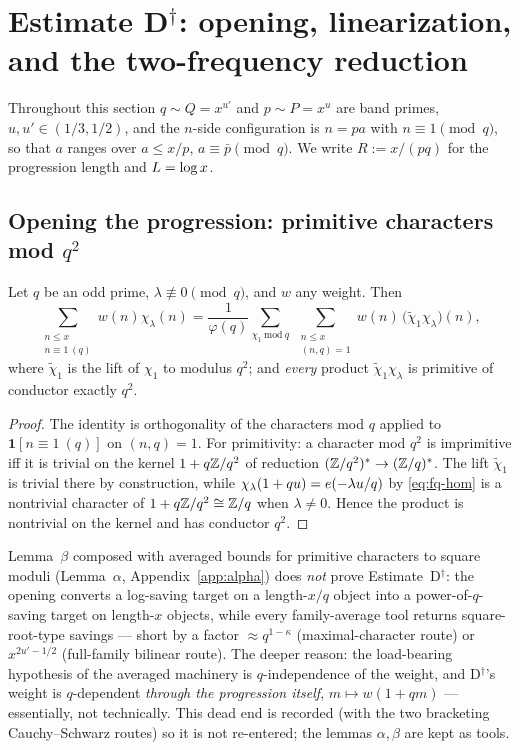 \section{Estimate D$^\dagger$: opening, linearization, and the
two-frequency reduction}\label{sec:reduction}

Throughout this section $q\sim Q=x^{u'}$ and $p\sim P=x^{u}$ are band
primes, $u,u'\in(1/3,1/2)$, and the $n$-side configuration is $n=pa$ with
$n\equiv1\pmod q$, so that $a$ ranges over $a\le x/p$,
$a\equiv\bar p\pmod q$. We write $R:=x/(pq)$ for the progression length
and $L=\log x$.

\subsection{Opening the progression: primitive characters mod $q^2$}

\begin{lemma}\label{lem:beta}
\statusPM\quad
Let $q$ be an odd prime, $\lambda\not\equiv0\pmod q$, and $w$ any weight.
Then
\[
\sum_{\substack{n\le x\\ n\equiv1\,(q)}}w(n)\chi_\lambda(n)
=\frac{1}{\varphi(q)}\sum_{\chi_1\ \mathrm{mod}\ q}\
\sum_{\substack{n\le x\\(n,q)=1}}w(n)\,\big(\tilde\chi_1\chi_\lambda\big)(n),
\]
where $\tilde\chi_1$ is the lift of $\chi_1$ to modulus $q^2$; and
\emph{every} product $\tilde\chi_1\chi_\lambda$ is primitive of conductor
exactly $q^2$.
\end{lemma}

\begin{proof}
The identity is orthogonality of the characters mod $q$ applied to
$\mathbf 1[n\equiv1\ (q)]$ on $(n,q)=1$. For primitivity: a character mod
$q^2$ is imprimitive iff it is trivial on the kernel
$1+q\mathbb{Z}/q^2$ of reduction $(\mathbb{Z}/q^2)^*\to(\mathbb{Z}/q)^*$. The lift
$\tilde\chi_1$ is trivial there by construction, while
$\chi_\lambda(1+qu)=e\!\left(-\lambda u/q\right)$ by \eqref{eq:fq-hom} is a nontrivial
character of $1+q\mathbb{Z}/q^2\cong\mathbb{Z}/q$ when $\lambda\ne0$. Hence the product is
nontrivial on the kernel and has conductor $q^2$.
\end{proof}

\begin{remark}\label{rem:negative}
Lemma~$\beta$ composed with averaged bounds for primitive characters to
square moduli (Lemma~$\alpha$, Appendix~\ref{app:alpha}) does \emph{not}
prove Estimate~D$^\dagger$: the opening converts a log-saving target on a
length-$x/q$ object into a power-of-$q$-saving target on length-$x$
objects, while every family-average tool returns square-root-type savings
--- short by a factor $\approx q^{1-\kappa}$ (maximal-character route) or
$x^{2u'-1/2}$ (full-family bilinear route). The deeper reason: the
load-bearing hypothesis of the averaged machinery is $q$-independence of
the weight, and D$^\dagger$'s weight is $q$-dependent \emph{through the
progression itself}, $m\mapsto w(1+qm)$ --- essentially, not technically.
This dead end is recorded (with the two bracketing Cauchy--Schwarz routes)
so it is not re-entered; the lemmas $\alpha,\beta$ are kept as tools.
\end{remark}

